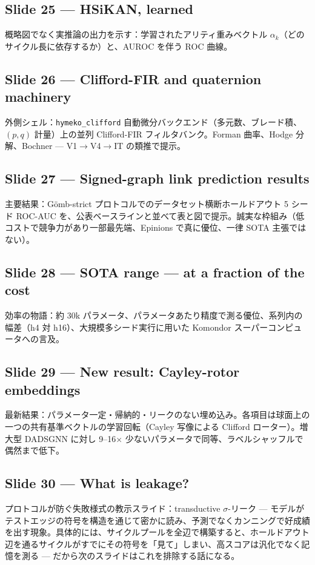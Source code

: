 \documentclass[10pt]{article}
\begin{document}
\subsection*{Slide 25 --- HSiKAN, learned}
概略図でなく実推論の出力を示す：学習されたアリティ重みベクトル $\alpha_k$（どのサイクル長に依存するか）と、AUROC を伴う ROC 曲線。

\subsection*{Slide 26 --- Clifford-FIR and quaternion machinery}
外側シェル：\texttt{hymeko\_clifford} 自動微分バックエンド（多元数、ブレード積、$(p,q)$ 計量）上の並列 Clifford-FIR フィルタバンク。Forman 曲率、Hodge 分解、Bochner --- V1$\to$V4$\to$IT の類推で提示。

\subsection*{Slide 27 --- Signed-graph link prediction results}
主要結果：G\"omb-strict プロトコルでのデータセット横断ホールドアウト 5 シード ROC-AUC を、公表ベースラインと並べて表と図で提示。誠実な枠組み（低コストで競争力があり一部最先端、Epinions で真に優位、一律 SOTA 主張ではない）。

\subsection*{Slide 28 --- SOTA range --- at a fraction of the cost}
効率の物語：約 30k パラメータ、パラメータあたり精度で測る優位、系列内の幅差（h4 対 h16）、大規模多シード実行に用いた Komondor スーパーコンピュータへの言及。

\subsection*{Slide 29 --- New result: Cayley-rotor embeddings}
最新結果：パラメータ一定・帰納的・リークのない埋め込み。各項目は球面上の一つの共有基準ベクトルの学習回転（Cayley 写像による Clifford ローター）。増大型 DADSGNN に対し 9--16$\times$ 少ないパラメータで同等、ラベルシャッフルで偶然まで低下。

\subsection*{Slide 30 --- What is leakage?}
プロトコルが防ぐ失敗様式の教示スライド：transductive $\sigma$-リーク --- モデルがテストエッジの符号を構造を通じて密かに読み、予測でなくカンニングで好成績を出す現象。具体的には、サイクルプールを全辺で構築すると、ホールドアウト辺を通るサイクルがすでにその符号を「見て」しまい、高スコアは汎化でなく記憶を測る --- だから次のスライドはこれを排除する話になる。
\end{document}
